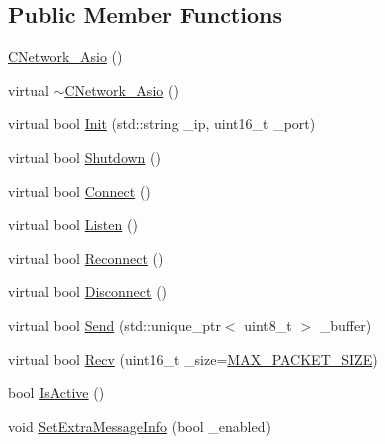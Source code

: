 \subsection*{Public Member Functions}
\begin{DoxyCompactItemize}
\item 
\hyperlink{classCore_1_1CNetwork__Asio_a9ef0f93160b19262ebad0ebc42f8c910}{C\+Network\+\_\+\+Asio} ()
\item 
virtual \hyperlink{classCore_1_1CNetwork__Asio_a642030ea5baa0f3a5b08a73dfdc4df79}{$\sim$\+C\+Network\+\_\+\+Asio} ()
\item 
virtual bool \hyperlink{classCore_1_1CNetwork__Asio_a6510dd6c07d2de995242f9ea827b97d1}{Init} (std\+::string \+\_\+ip, uint16\+\_\+t \+\_\+port)
\item 
virtual bool \hyperlink{classCore_1_1CNetwork__Asio_a1990de08bdc733e76d575f13b03072d0}{Shutdown} ()
\item 
virtual bool \hyperlink{classCore_1_1CNetwork__Asio_a126de0c3a03d6f2efe21f2b1888285b4}{Connect} ()
\item 
virtual bool \hyperlink{classCore_1_1CNetwork__Asio_accbfdbf25e902928bbe3809307510505}{Listen} ()
\item 
virtual bool \hyperlink{classCore_1_1CNetwork__Asio_a57f1ef8e8849990b393b27fcece6871d}{Reconnect} ()
\item 
virtual bool \hyperlink{classCore_1_1CNetwork__Asio_aa98b86ad1ade6a4de084577a30b6d6d4}{Disconnect} ()
\item 
virtual bool \hyperlink{classCore_1_1CNetwork__Asio_a2f84428ff2250e960ba2739b45f491a2}{Send} (std\+::unique\+\_\+ptr$<$ uint8\+\_\+t $>$ \+\_\+buffer)
\item 
virtual bool \hyperlink{classCore_1_1CNetwork__Asio_a08865b2606dcef0e38f27532b1ae3909}{Recv} (uint16\+\_\+t \+\_\+size=\hyperlink{cnetwork__asio_8h_a879456c3b8e2853f7044d764e9c180d4}{M\+A\+X\+\_\+\+P\+A\+C\+K\+E\+T\+\_\+\+S\+I\+ZE})
\item 
bool \hyperlink{classCore_1_1CNetwork__Asio_a0529c15321b8065795b692d2da8830a6}{Is\+Active} ()
\item 
void \hyperlink{classCore_1_1CNetwork__Asio_ad2664e347338dc680ba117f896c759b5}{Set\+Extra\+Message\+Info} (bool \+\_\+enabled)
\end{DoxyCompactItemize}
